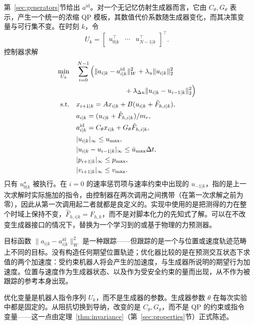 \documentclass[journal]{IEEEtran}
\begin{document}
第~\ref{sec:generators}节给出 $a^{\mathrm{id}}$。对一个无记忆仿射生成器而言，它由 $C_\theta,G_\theta$ 表示，产生一个统一的浓缩 QP 模板，其数值代价系数随生成器变化，而其决策变量与可行集不变。在时刻 $k$，令
\begin{equation}
U_k= \begin{bmatrix} u_{0|k}^\top&\cdots&u_{N-1|k}^\top \end{bmatrix}^\top.
\end{equation}
控制器求解
\begin{equation}
\begin{aligned}
\min_{U_k}\quad& \sum_{i=0}^{N-1}\Big(
\|a_{i|k}-a_{i|k}^{\mathrm{id}}\|_W^2
+\lambda_u\|u_{i|k}\|_2^2\\
&\hspace{25mm}+\lambda_{\Delta u}
\|u_{i|k}-u_{i-1|k}\|_2^2\Big)\\
\text{s.t.}\quad&x_{i+1|k}=Ax_{i|k}+B(u_{i|k}+\hat F_{h,i|k}),\\
&a_{i|k}=(u_{i|k}+\hat F_{h,i|k})/m_r,\\
&a_{i|k}^{\mathrm{id}} =C_\theta x_{i|k}+G_\theta\hat F_{h,i|k},\\
&|u_{i|k}|_\infty\le u_{\max},\\
&|u_{i|k}-u_{i-1|k}|_\infty \le\dot u_{\max}\Delta t,\\
&|p_{i+1|k}|_\infty\le p_{\max},\\
&|v_{i+1|k}|_\infty\le v_{\max}.
\end{aligned}
\end{equation}
只有 $u_{0|k}^\star$ 被执行。在 $i=0$ 的速率惩罚项与速率约束中出现的 $u_{-1|k}$，指的是上一次求解时实际施加的指令，由控制器在两次调用之间携带（在第一次求解之前为零），因此从第一次调用起二者就都是良定义的。实现中使用的是把测得的力在整个时域上保持不变，$\hat F_{h,i|k}=F_{h,k}$，而不是对脚本化力的先知式了解。可以在不改变生成器接口的情况下，替换为一个学习到的或基于物理的力预测器。

目标函数 $\|a_{i|k}-a_{i|k}^{\mathrm{id}}\|_W^2$ 是一种跟踪——但跟踪的是一个与位置或速度轨迹范畴上不同的目标。没有构造任何期望位置轨迹；优化器比较的是在预测交互状态下求值的两个加速度：受约束机器人将会产生的加速度，与生成器所说明的期望行为加速度。位置与速度作为生成器状态、以及作为受安全约束的量而出现，从不作为被跟踪的参考本身出现。

优化变量是机器人指令序列 $U_k$，而不是生成器的参数。生成器参数 $\theta$ 在每次实验中都是固定的。从阻抗切换到导纳，改变的是 $C_\theta,G_\theta$，而不是 QP 的约束或指令变量——这一点由定理~\ref{thm:invariance}（第~\ref{sec:properties}节）正式陈述。
\end{document}
